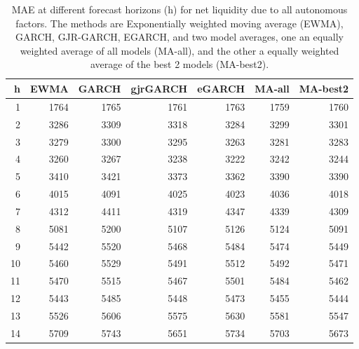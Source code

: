 \begin{table}[ht]
\centering
\begin{tabular}{rrrrrrr}
  \hline
h & EWMA & GARCH & gjrGARCH & eGARCH & MA-all & MA-best2 \\ 
  \hline
1 & 1764 & 1765 & 1761 & 1763 & 1759 & 1760 \\ 
  2 & 3286 & 3309 & 3318 & 3284 & 3299 & 3301 \\ 
  3 & 3279 & 3300 & 3295 & 3263 & 3281 & 3283 \\ 
  4 & 3260 & 3267 & 3238 & 3222 & 3242 & 3244 \\ 
  5 & 3410 & 3421 & 3373 & 3362 & 3390 & 3390 \\ 
  6 & 4015 & 4091 & 4025 & 4023 & 4036 & 4018 \\ 
  7 & 4312 & 4411 & 4319 & 4347 & 4339 & 4309 \\ 
  8 & 5081 & 5200 & 5107 & 5126 & 5124 & 5091 \\ 
  9 & 5442 & 5520 & 5468 & 5484 & 5474 & 5449 \\ 
  10 & 5460 & 5529 & 5491 & 5512 & 5492 & 5471 \\ 
  11 & 5470 & 5515 & 5467 & 5501 & 5484 & 5462 \\ 
  12 & 5443 & 5485 & 5448 & 5473 & 5455 & 5444 \\ 
  13 & 5526 & 5606 & 5575 & 5630 & 5581 & 5547 \\ 
  14 & 5709 & 5743 & 5651 & 5734 & 5703 & 5673 \\ 
   \hline
\end{tabular}
\caption{MAE at different forecast horizons (h) for net liquidity due to all autonomous factors. The methods are Exponentially weighted moving average (EWMA), GARCH, GJR-GARCH, EGARCH, and two model averages, one an equally weighted average of all models (MA-all), and the other a equally weighted average of the best 2 models (MA-best2).} 
\label{tab:maeagg}
\end{table}


